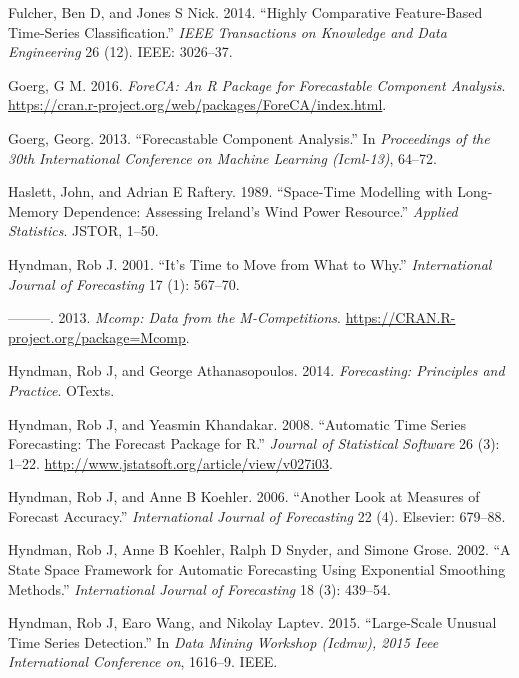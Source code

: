 \documentclass[11pt,]{article}
\theoremstyle{definition}
\theoremstyle{definition}
\theoremstyle{definition}
\theoremstyle{remark}
\begin{document}
\hypertarget{ref-fulcher2014highly}{}
Fulcher, Ben D, and Jones S Nick. 2014. ``Highly Comparative
Feature-Based Time-Series Classification.'' \emph{IEEE Transactions on
Knowledge and Data Engineering} 26 (12). IEEE: 3026--37.

\hypertarget{ref-Foreca}{}
Goerg, G M. 2016. \emph{ForeCA: An R Package for Forecastable Component
Analysis}.
\url{https://cran.r-project.org/web/packages/ForeCA/index.html}.

\hypertarget{ref-goerg2013forecastable}{}
Goerg, Georg. 2013. ``Forecastable Component Analysis.'' In
\emph{Proceedings of the 30th International Conference on Machine
Learning (Icml-13)}, 64--72.

\hypertarget{ref-haslett1989space}{}
Haslett, John, and Adrian E Raftery. 1989. ``Space-Time Modelling with
Long-Memory Dependence: Assessing Ireland's Wind Power Resource.''
\emph{Applied Statistics}. JSTOR, 1--50.

\hypertarget{ref-hyndman2001s}{}
Hyndman, Rob J. 2001. ``It's Time to Move from What to Why.''
\emph{International Journal of Forecasting} 17 (1): 567--70.

\hypertarget{ref-hyndmanmcomp}{}
---------. 2013. \emph{Mcomp: Data from the M-Competitions}.
\url{https://CRAN.R-project.org/package=Mcomp}.

\hypertarget{ref-hyndman2014forecasting}{}
Hyndman, Rob J, and George Athanasopoulos. 2014. \emph{Forecasting:
Principles and Practice}. OTexts.

\hypertarget{ref-Hyndman2008}{}
Hyndman, Rob J, and Yeasmin Khandakar. 2008. ``Automatic Time Series
Forecasting: The Forecast Package for R.'' \emph{Journal of Statistical
Software} 26 (3): 1--22.
\url{http://www.jstatsoft.org/article/view/v027i03}.

\hypertarget{ref-hyndman2006another}{}
Hyndman, Rob J, and Anne B Koehler. 2006. ``Another Look at Measures of
Forecast Accuracy.'' \emph{International Journal of Forecasting} 22 (4).
Elsevier: 679--88.

\hypertarget{ref-Hyndman2002}{}
Hyndman, Rob J, Anne B Koehler, Ralph D Snyder, and Simone Grose. 2002.
``A State Space Framework for Automatic Forecasting Using Exponential
Smoothing Methods.'' \emph{International Journal of Forecasting} 18 (3):
439--54.

\hypertarget{ref-hyndman2015large}{}
Hyndman, Rob J, Earo Wang, and Nikolay Laptev. 2015. ``Large-Scale
Unusual Time Series Detection.'' In \emph{Data Mining Workshop (Icdmw),
2015 Ieee International Conference on}, 1616--9. IEEE.
\end{document}
